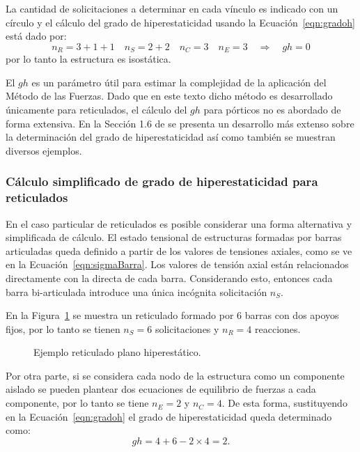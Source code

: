 La cantidad de solicitaciones a determinar en cada vínculo es indicado con un círculo y el cálculo del grado de hiperestaticidad usando la Ecuación~\eqref{eqn:gradoh} está dado por:
%
\begin{equation}
	n_R = 3+1+1 \quad n_S = 2+2 \quad n_C = 3 \quad n_E = 3 \quad \Rightarrow \quad gh = 0
\end{equation}
%
por lo tanto la estructura es isostática.

El $gh$ es un parámetro útil para estimar la complejidad de la aplicación del Método de las Fuerzas. %
%
Dado que en este texto dicho método es desarrollado únicamente para reticulados, el cálculo del $gh$ para pórticos no es abordado de forma extensiva. %
%
En la Sección 1.6 de \citep{CerveraRuiz2002ii} se presenta un desarrollo más extenso sobre la determinación del grado de hiperestaticidad así como también se muestran diversos ejemplos.


\subsubsection{Cálculo simplificado de grado de hiperestaticidad para reticulados}

En el caso particular de reticulados es posible considerar una forma alternativa y simplificada de cálculo. %
% 
El estado tensional de estructuras formadas por barras articuladas queda definido a partir de los valores de tensiones axiales, como se ve en la Ecuación~\ref{eqn:sigmaBarra}. %
%
Los valores de tensión axial están relacionados directamente con la directa de cada barra. %
%
Considerando esto, entonces cada barra bi-articulada introduce una única incógnita solicitación $n_S$.

En la Figura~\ref{fig:retic_gh} se muestra un reticulado formado por 6 barras con dos apoyos fijos, por lo tanto se tienen $n_S=6$ solicitaciones y $n_R=4$ reacciones. %

\begin{figure}[htb]
	\centering
	\def\svgwidth{0.6\textwidth}
	
	\caption{Ejemplo reticulado plano hiperestático.}
	\label{fig:retic_gh}
\end{figure}

Por otra parte, si se considera cada nodo de la estructura como un componente aislado se pueden plantear dos ecuaciones de equilibrio de fuerzas a cada componente, por lo tanto se tiene $n_E = 2$ y $n_C =4$. %
%
De esta forma, sustituyendo en la Ecuación~\ref{eqn:gradoh} el grado de hiperestaticidad queda determinado como:
%
\begin{equation}
	gh = 4 + 6 - 2 \times 4 = 2.
\end{equation}

